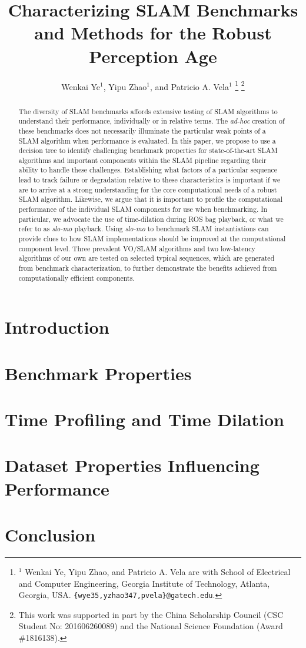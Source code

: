 \documentclass[letterpaper, 10 pt, conference]{ieeeconf}  %
\title{\LARGE \bf
Characterizing SLAM Benchmarks and Methods for the Robust Perception Age
}
\author{Wenkai Ye$^{1}$, Yipu Zhao$^{1}$, and Patricio A. Vela$^{1}$%
\thanks{$^{1}$%
Wenkai Ye, Yipu Zhao, and Patricio A. Vela  
are with School of Electrical and Computer Engineering, 
Georgia Institute of Technology, Atlanta, Georgia, USA. 
{\tt\small \{wye35,yzhao347,pvela\}@gatech.edu}. }%
\thanks{
This work was supported in part by the China Scholarship Council 
(CSC Student No: 201606260089) and the National Science Foundation 
(Award \#1816138).
}%
}
\begin{document}
\maketitle
\thispagestyle{empty}
\pagestyle{empty}

\begin{abstract}
The diversity of SLAM benchmarks affords extensive testing of SLAM
algorithms to understand their performance, individually or in relative
terms. The \textit{ad-hoc} creation of these benchmarks does not necessarily
illuminate the particular weak points of a SLAM algorithm when performance is
evaluated. In this paper, we propose to use a decision tree to identify challenging 
benchmark properties for state-of-the-art SLAM algorithms and important components 
within the SLAM pipeline regarding their ability to handle these challenges.
Establishing what factors of a particular
sequence lead to track failure or degradation relative to these
characteristics is important if we are to arrive at a strong 
understanding for the core computational needs of a robust SLAM algorithm.
Likewise, we argue that it is important to profile the computational
performance of the individual SLAM components for use when benchmarking.
In particular, we advocate the use of time-dilation during ROS bag
playback, or what we refer to as \textit{slo-mo} playback. 
Using \textit{slo-mo} to benchmark SLAM instantiations can provide clues to how
SLAM implementations should be improved at the computational component
level. Three prevalent VO/SLAM algorithms and two low-latency algorithms 
of our own are tested on selected typical sequences, which are generated from 
benchmark characterization, to further demonstrate the benefits achieved from 
computationally efficient components.
\end{abstract}


\section{Introduction}



\section{Benchmark Properties}
\label{sec:bench}


\section{Time Profiling and Time Dilation}
\label{sec:timing}


\section{Dataset Properties Influencing Performance}
\label{sec:eval}


\section{Conclusion}



\balance 


\end{document}
